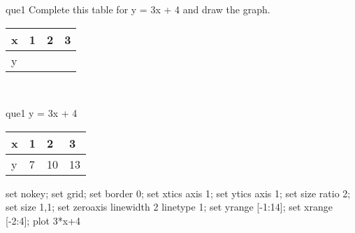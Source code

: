 \documentclass[13.5pt, varwidth=true]{beamer}
\begin{document}
\begin{frame}[shrink=19,fragile]
	\begin{beamercolorbox}[rounded=true, left, shadow=true,wd=14.8cm]{que1}
		 Complete this table for y = 3x + 4 and draw the graph. \\[0.3cm] \renewcommand{\arraystretch}{1.2}\begin{tabular}{|C|C|C|C|} \hline x & 1 & 2 & 3 \\ \hline y & & & \\ \hline \end{tabular}\\[0.3cm]
	\end{beamercolorbox}
\end{frame}
\begin{frame}[shrink=19,fragile]
	\begin{beamercolorbox}[rounded=true, left, shadow=true,wd=14.8cm]{que1}
		y = 3x + 4\renewcommand{\arraystretch}{1.2}\begin{tabular}{|C|C|C|C|} \hline x & 1 & 2 & 3 \\ \hline y & 7 & 10 & 13\\ \hline \end{tabular}\begin{gnuplot}[terminal=pdf] set nokey; set grid; set border 0; set xtics axis 1; set ytics axis 1; set size ratio 2; set size 1,1; set zeroaxis linewidth 2 linetype 1; set yrange [-1:14]; set xrange [-2:4]; plot 3*x+4 \end{gnuplot}
	\end{beamercolorbox}
\end{frame}
\end{document}
